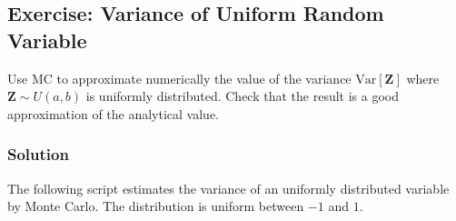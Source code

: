 \documentclass[letterpaper,10pt,english]{jupyterBook}
\begin{document}
\subsection{Exercise: Variance of Uniform Random Variable}
\label{\detokenize{01:exercise-variance-of-uniform-random-variable}}
\sphinxAtStartPar
Use MC to approximate numerically the value of the variance \(\mbox{Var}[{\mathbf Z}]\) where \({\mathbf Z} \sim U(a,b)\) is uniformly distributed. Check that the result is a good approximation of the analytical value.


\subsubsection{Solution}
\label{\detokenize{01:id6}}
\sphinxAtStartPar
The following script estimates the variance of an uniformly distributed variable by Monte Carlo. The distribution is uniform between \(-1\) and \(1\).
\end{document}
